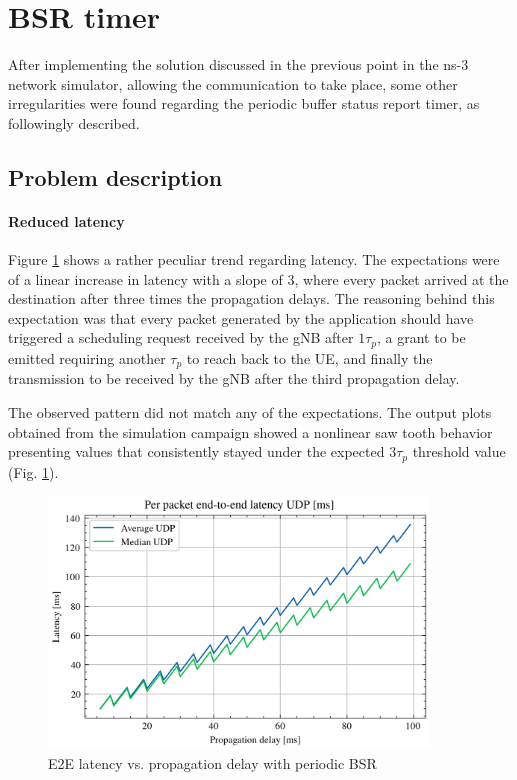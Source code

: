 \section{BSR timer}
\label{sec:bsr-timer}
After implementing the solution discussed in the previous point in the ns-3 network simulator, allowing the communication to take place, some other irregularities were found regarding the periodic buffer status report timer, as followingly described. 

\subsection{Problem description}

\paragraph{Reduced latency}

Figure \ref{fig:lat-saw} shows a rather peculiar trend regarding latency. The expectations were of a linear increase in latency with a slope of 3, where every packet arrived at the destination after three times the propagation delays. The reasoning behind this expectation was that every packet generated by the application should have triggered a scheduling request received by the \ac{gNB} after $1\tau_p$, a grant to be emitted requiring another $\tau_p$ to reach back to the \ac{UE}, and finally the transmission to be received by the \ac{gNB} after the third propagation delay.

The observed pattern did not match any of the expectations. The output plots obtained from the simulation campaign showed a nonlinear saw tooth behavior presenting values that consistently stayed under the expected $3\tau_p$ threshold value (Fig. \ref{fig:lat-saw}).

\begin{figure}[ht]
    \centering
    \includegraphics[width=0.9\textwidth]{res/lat-udp-saw.png}
    \caption{E2E latency vs. propagation delay with periodic \ac{BSR}}
    \label{fig:lat-saw}
\end{figure}

